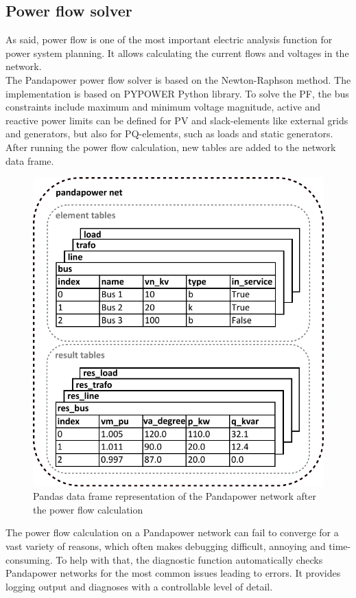 \subsection{Power flow solver}
As said, power flow is one of the most important electric analysis function for power system planning. It allows calculating the current flows and voltages in the network. \\
The Pandapower power flow solver is based on the Newton-Raphson method. The implementation is based on PYPOWER Python library. To solve the \gls{PF}, the bus constraints include maximum and minimum voltage magnitude, active and reactive power limits can be defined for PV and slack-elements like external grids and generators, but also for PQ-elements, such as loads and static generators. \\


After running the power flow calculation, new tables are added to the network data frame.
\begin{figure}[H]
\centering
    \includegraphics[width=.6\linewidth]{images/Background/Pandapower/Pandapower_resnet_big.pdf}
\caption[Pandapower data frame (after the power flow calculation)]{Pandas data frame representation of the Pandapower network after the power flow calculation}
\end{figure}

The power flow calculation on a Pandapower network can fail to converge for a vast variety of reasons, which often makes debugging difficult, annoying and time-consuming. To help with that, the diagnostic function automatically checks Pandapower networks for the most common issues leading to errors. It provides logging output and diagnoses with a controllable level of detail.

